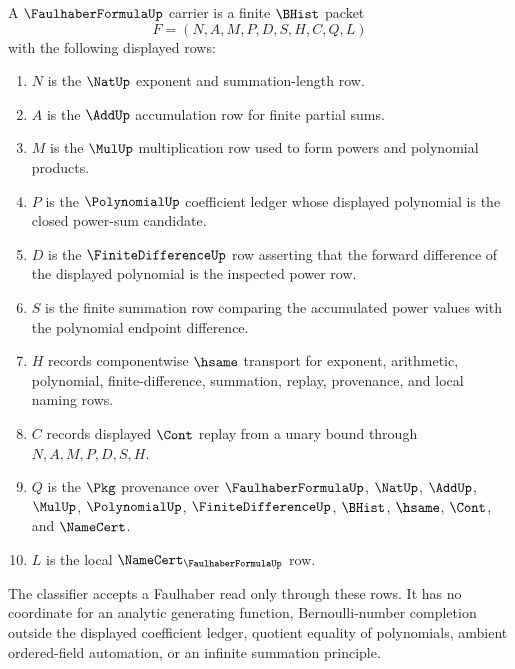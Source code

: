 \begin{definition}
\label{def:faulhaber-formula-carrier}
A $\FaulhaberFormulaUp$ carrier is a finite $\BHist$ packet
$$
F=(N,A,M,P,D,S,H,C,Q,L)
$$
with the following displayed rows:
\begin{enumerate}
\item $N$ is the $\NatUp$ exponent and summation-length row.
\item $A$ is the $\AddUp$ accumulation row for finite partial sums.
\item $M$ is the $\MulUp$ multiplication row used to form powers and polynomial products.
\item $P$ is the $\PolynomialUp$ coefficient ledger whose displayed polynomial is the closed power-sum candidate.
\item $D$ is the $\FiniteDifferenceUp$ row asserting that the forward difference of the displayed polynomial is the inspected power row.
\item $S$ is the finite summation row comparing the accumulated power values with the polynomial endpoint difference.
\item $H$ records componentwise $\hsame$ transport for exponent, arithmetic, polynomial, finite-difference, summation, replay, provenance, and local naming rows.
\item $C$ records displayed $\Cont$ replay from a unary bound through $N,A,M,P,D,S,H$.
\item $Q$ is the $\Pkg$ provenance over $\FaulhaberFormulaUp$, $\NatUp$, $\AddUp$, $\MulUp$, $\PolynomialUp$, $\FiniteDifferenceUp$, $\BHist$, $\hsame$, $\Cont$, and $\NameCert$.
\item $L$ is the local $\NameCert_{\FaulhaberFormulaUp}$ row.
\end{enumerate}
The classifier accepts a Faulhaber read only through these rows. It has no coordinate for an analytic generating function, Bernoulli-number completion outside the displayed coefficient ledger, quotient equality of polynomials, ambient ordered-field automation, or an infinite summation principle.
\end{definition}

